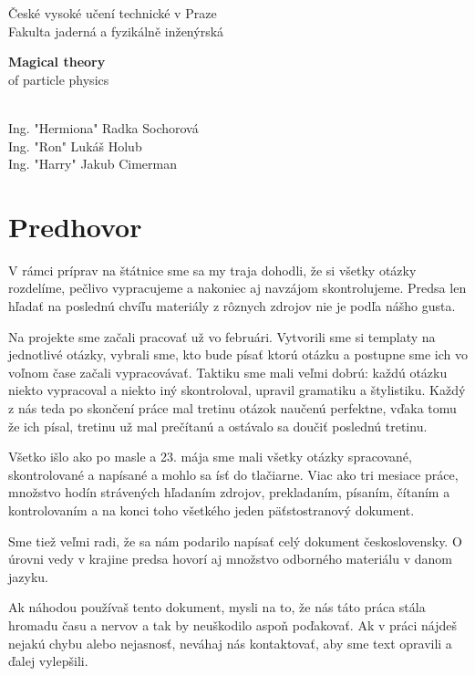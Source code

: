\documentclass[12pt]{book}
\def\mfrok{2018}
\def\hermiona{Ing. "Hermiona" Radka Sochorová}
\def\ron{Ing. "Ron" Lukáš Holub}
\def\harry{Ing. "Harry" Jakub Cimerman}
\begin{document}
     

\thispagestyle{empty}

\begin{center}
\sc\large
České vysoké učení technické v Praze\\
Fakulta jaderná a fyzikálně inženýrská

\vfill

{\Huge\textbf{Magical theory}\\ \vspace{0.2cm}
\Large of particle physics}
\end{center}

\vfill

{\sc\large 
\noindent \mfrok\\
\hermiona \\
\ron \\
\harry
}

\eject %


\newpage

\chapter*{Predhovor}

V rámci príprav na štátnice sme sa my traja dohodli, že si všetky otázky rozdelíme, pečlivo vypracujeme a nakoniec aj navzájom skontrolujeme. Predsa len hľadať na poslednú chvíľu materiály z rôznych zdrojov nie je podľa nášho gusta. 

Na projekte sme začali pracovať už vo februári. Vytvorili sme si templaty na jednotlivé otázky, vybrali sme, kto bude písať ktorú otázku a postupne sme ich vo voľnom čase začali vypracovávať. Taktiku sme mali veľmi dobrú: každú otázku niekto vypracoval a niekto iný skontroloval, upravil gramatiku a štylistiku. Každý z nás teda po skončení práce mal tretinu otázok naučenú perfektne, vďaka tomu že ich písal, tretinu už mal prečítanú a ostávalo sa doučiť poslednú tretinu.

Všetko išlo ako po masle a 23. mája sme mali všetky otázky spracované, skontrolované a napísané a mohlo sa ísť do tlačiarne. Viac ako tri mesiace práce, množstvo hodín strávených hľadaním zdrojov, prekladaním, písaním, čítaním a kontrolovaním a na konci toho všetkého jeden päťstostranový dokument. 

Sme tiež veľmi radi, že sa nám podarilo napísať celý dokument československy. O úrovni vedy v krajine predsa hovorí aj množstvo odborného materiálu v danom jazyku.

Ak náhodou používaš tento dokument, mysli na to, že nás táto práca stála hromadu času a nervov a tak by neuškodilo aspoň poďakovať. Ak v práci nájdeš nejakú chybu alebo nejasnosť, neváhaj nás kontaktovať, aby sme text opravili a ďalej vylepšili.
\end{document}
